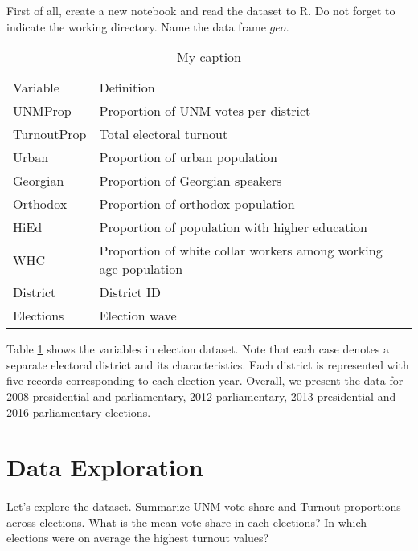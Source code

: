 \documentclass{article}\usepackage[]{graphicx}\usepackage[]{color}
\begin{document}
First of all, create a new notebook and read the dataset to R. Do not forget to indicate the working directory. Name the data frame $geo$.

\begin{table}[]
\centering
\caption{My caption}
\label{lab1}
\begin{tabular}{ll}
Variable    & Definition                                                      \\
UNMProp     & Proportion of UNM votes per district                            \\
TurnoutProp & Total electoral turnout                                         \\
Urban       & Proportion of urban population                                  \\
Georgian    & Proportion of Georgian speakers                                 \\
Orthodox    & Proportion of orthodox population                               \\
HiEd        & Proportion of population with higher education                  \\
WHC         & Proportion of white collar workers among working age population \\
District    & District ID                                                     \\
Elections   & Election wave                                                  
\end{tabular}
\end{table}

Table \ref{lab1} shows the variables in election dataset. Note that each case denotes a separate electoral district and its characteristics. Each district is represented with five records corresponding to each election year. Overall, we present the data for 2008 presidential and parliamentary, 2012 parliamentary, 2013 presidential and 2016 parliamentary elections.

\section*{Data Exploration}
\paragraph{}

Let's explore the dataset. Summarize UNM vote share and Turnout proportions across elections. What is the mean vote share in each elections? In which elections were on average the highest turnout values?
\end{document}
